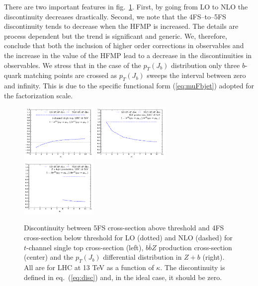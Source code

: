 \documentclass[letter,11pt]{article}
\def\k{\kappa}
\begin{document}
There are two important features in fig.~\ref{fig:disc3procs}. First, by going from LO to NLO the discontinuity decreases drastically. Second, we note that the 4FS--to--5FS discontinuity tends to decrease when the HFMP is increased. The details are process dependent but the trend is significant and generic. We, therefore, conclude that both the inclusion of higher order corrections in observables and the increase in the value of the HFMP lead to a decrease in the discontinuities in observables. We stress that in the case of the $p_T(J_b)$ distribution only three $b$-quark matching points are crossed as $p_T(J_b)$ sweeps the interval between zero and infinity. This is due to the specific functional form (\ref{eq:muFbjet}) adopted for the factorization scale. 
%
\begin{figure}[t]
\centering
\hskip-6pt
\includegraphics[trim=0.4cm 0.0cm 0.3cm 0.4cm,clip,width=0.33\textwidth]{./tj_5f4f_ratios.pdf}
\includegraphics[trim=0.4cm 0.0cm 0.3cm 0.4cm,clip,width=0.33\textwidth]{./zbb_5f4f_ratios.pdf}
\includegraphics[trim=0.4cm 0.0cm 0.3cm 0.4cm,clip,width=0.33\textwidth]{./zbj_5f4f_ratios.pdf}
\caption{Discontinuity between 5FS cross-section above threshold and 4FS cross-section below threshold for LO (dotted) and NLO (dashed) for $t$-channel single top cross-section (left), $b\bar{b}Z$ production cross-section (center) and the $p_T(J_b)$ differential distribution in $Z+b$ (right). All are for LHC at 13 TeV as a function of $\k$. The discontinuity is defined in eq.~(\ref{eq:disc}) and, in the ideal case, it should be zero.}
\label{fig:disc3procs}
\end{figure}
%
\end{document}
